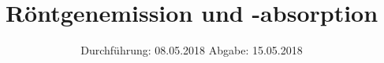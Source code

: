 

\subject{V602}
\title{Röntgenemission und -absorption}
\date{%
  Durchführung: 08.05.2018
  \hspace{3em}
  Abgabe: 15.05.2018
}



\maketitle
\thispagestyle{empty}
\tableofcontents
\newpage






\printbibliography{}


